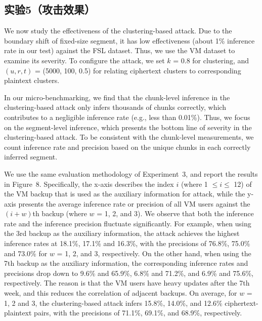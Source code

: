 \subsection{实验5（攻击效果）} 

We now study the
effectiveness of the clustering-based attack. Due to the boundary shift of
fixed-size segment, it has low effectiveness
(about 1\% inference rate in our test) against the FSL dataset.  Thus, we use
the VM dataset to examine its severity. To configure the attack, we set $k$ =
0.8 for clustering, and $(u, r, t)$ = (5000, 100, 0.5) for relating ciphertext
clusters to corresponding plaintext clusters.  

In our micro-benchmarking, we find that the chunk-level inference in the
clustering-based attack only infers thousands of chunks correctly, which
contributes to a negligible inference rate (e.g., less than 0.01\%).  
Thus, we focus on the
segment-level inference, which presents the bottom line of severity in the
clustering-based attack. To be consistent with the chunk-level measurements, we count inference rate and precision based
on the unique chunks in each correctly inferred segment. 

We use the same evaluation methodology of Experiment~3, and report the results
in Figure~8. Specifically, the x-axis describes the index $i$ (where 1 $\leq i \leq$
12) of the VM backup that is used as the auxiliary information for attack,
while the y-axis presents the average inference rate or precision of all VM
users against the $(i+w)$th backup (where $w$ = 1, 2, and 3). We observe that both the inference rate and the inference
precision fluctuate significantly. For example, when using the 3rd backup as
the auxiliary information, the attack achieves the highest inference rates at
18.1\%, 17.1\% and 16.3\%, with the precisions of 76.8\%, 75.0\% and 73.0\%
for $w$ = 1, 2, and 3, respectively. 
On the other hand, when using the 7th
backup as the auxiliary information, the corresponding inference rates and
precisions drop down to 9.6\% and 65.9\%, 6.8\% and 71.2\%, and 6.9\% and
75.6\%, respectively. The reason is that the VM users have heavy updates after
the 7th week, and this reduces the correlation  of adjacent backups. 
On
average, for $w$ = 1, 2 and 3, the clustering-based attack infers 15.8\%,
14.0\%, and 12.6\% ciphertext-plaintext pairs, with the precisions of 71.1\%,
69.1\%, and 68.9\%, respectively. 

